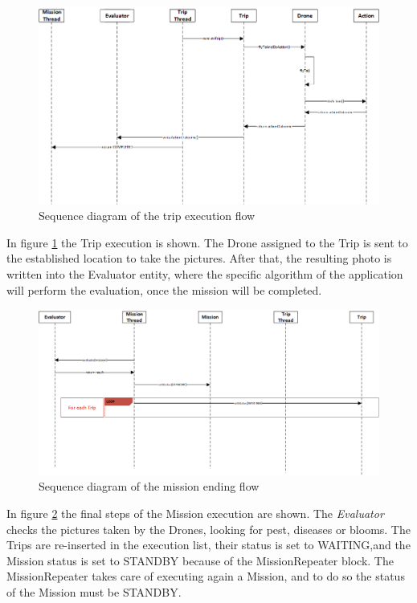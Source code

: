 \begin{figure}[H]
  \centering
  \includegraphics[width=\linewidth]{pictures/Alfalfa_Sequence_TripExecution.png}
  \caption{Sequence diagram of the trip execution flow}
  \label{fig:alfalfaSequence3}
\end{figure}

In figure \ref{fig:alfalfaSequence3} the Trip execution is shown.
The Drone assigned to the Trip is sent to the established location to take the pictures.
After that, the resulting photo is written into the Evaluator entity, where the specific algorithm of the application will perform the evaluation, once the mission will be completed.
\\

\begin{figure}[H]
  \centering
  \includegraphics[width=\linewidth]{pictures/Alfalfa_Sequence_MissionEnd.png}
  \caption{Sequence diagram of the mission ending flow}
  \label{fig:alfalfaSequence4}
\end{figure}

In figure \ref{fig:alfalfaSequence4} the final steps of the Mission execution are shown.
The \textit{Evaluator} checks the pictures taken by the Drones, looking for pest, diseases or blooms.
The Trips are re-inserted in the execution list, their status is set to WAITING,and the Mission status is set to STANDBY because of the MissionRepeater block.
The MissionRepeater takes care of executing again a Mission, and to do so the status of the Mission must be STANDBY.
\\

